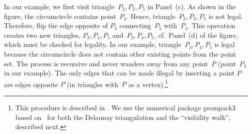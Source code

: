 \documentclass[a4paper,12pt]{article}
\begin{document}
In our example, we first visit triangle~$P_{2},P_{3},P_{5}$ in Panel~(c). As shown in the figure, the circumcircle contains point~$P_{4}$. Hence, triangle~$P_{2},P_{3},P_{5}$ is not legal. Therefore, flip the edge opposite of $P_{5}$ connecting~$P_{5}$ with~$P_{4}$. This operation creates two new triangles, $P_{3},P_{4},P_{5}$ and~$P_{2},P_{4},P_{5}$, cf.~Panel~(d) of the figure, which must be checked for legality. In our example, triangle~$P_{3},P_{4},P_{5}$ is legal because the circumcircle does not contain other existing points from the point set. The process is recursive and never wanders away from any point~$P$ (point~$P_{5}$ in our example). The only edges that can be made illegal by inserting a point $P$ are edges opposite $P$ (in triangles with~$P$ as a vertex).\footnote{This procedure is described in . We use the numerical package geompack3 based on~ for both the Delaunay triangulation and the ``visibility walk'', described next.}
\end{document}
